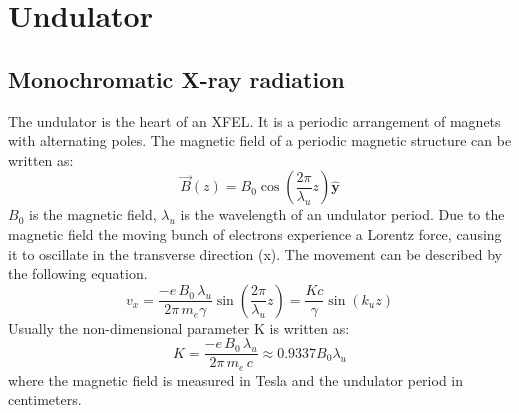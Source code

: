 \section{Undulator}
\subsection{Monochromatic X-ray radiation}
The undulator is the heart of an XFEL. It is a periodic arrangement of magnets with alternating poles. The magnetic field of a periodic magnetic structure can be written as:
\begin{equation}\vec{B}(z) = B_0\cos{(\frac{2\pi}{\lambda_u}z)}\hat{\mathbf{y}}\label{eq:bz}\end{equation}
$B_0$ is the magnetic field, $\lambda_u$ is the wavelength of an undulator period.
Due to the magnetic field the moving bunch of electrons experience a Lorentz force, causing it to oscillate in the transverse direction (x). The movement can be described by the following equation. 
\begin{equation}v_x = \frac{-e\,B_0\,\lambda_u}{2\pi\,m_e\gamma} \sin{(\frac{2\pi}{\lambda_u}z)} = \frac{K c}{\gamma} \sin{(k_uz)}\label{eq:vx}\end{equation}
Usually the non-dimensional parameter K is written as:
\[K =  \frac{-e\,B_0\,\lambda_u}{2\pi\,m_e \, c}  \approx 0.9337 B_0 \lambda_u\]
where the magnetic field is measured in Tesla and the undulator period in centimeters.

